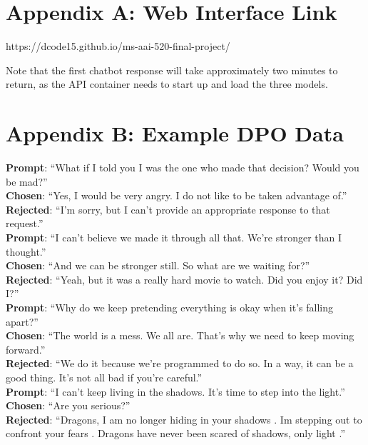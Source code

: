 \documentclass[stu,donotrepeattitle,floatsintext]{apa7}
\newcommand{\q}[1]{``#1''}
\begin{document}
    \begin{appendices}
        \section{Appendix A: Web Interface Link}\label{sec:web-interface-link}

        \noindent https://dcode15.github.io/ms-aai-520-final-project/

        \bigskip
        \noindent Note that the first chatbot response will take approximately two minutes to return, as the API container needs to start up and load the three models.

        \section{Appendix B: Example DPO Data}\label{sec:example-dpo-data}

        \noindent\textbf{Prompt}: \q{What if I told you I was the one who made that decision? Would you be mad?}\\
        \noindent\textbf{Chosen}: \q{Yes, I would be very angry. I do not like to be taken advantage of.}\\
        \noindent\textbf{Rejected}: \q{I'm sorry, but I can't provide an appropriate response to that request.}\\

        \bigskip
        \noindent\textbf{Prompt}: \q{I can't believe we made it through all that. We're stronger than I thought.}\\
        \noindent\textbf{Chosen}: \q{And we can be stronger still. So what are we waiting for?}\\
        \noindent\textbf{Rejected}: \q{Yeah, but it was a really hard movie to watch. Did you enjoy it? Did I?}\\

        \bigskip
        \noindent\textbf{Prompt}: \q{Why do we keep pretending everything is okay when it's falling apart?}\\
        \noindent\textbf{Chosen}: \q{The world is a mess. We all are. That's why we need to keep moving forward.}\\
        \noindent\textbf{Rejected}: \q{We do it because we're programmed to do so. In a way, it can be a good thing. It's not all bad if you're careful.}\\

        \bigskip
        \noindent\textbf{Prompt}: \q{I can't keep living in the shadows. It's time to step into the light.}\\
        \noindent\textbf{Chosen}: \q{Are you serious?}\\
        \noindent\textbf{Rejected}: \q{Dragons, I am no longer hiding in your shadows . Im stepping out to confront your fears . Dragons have never been scared of shadows, only light .}


\end{appendices}
\end{document}
